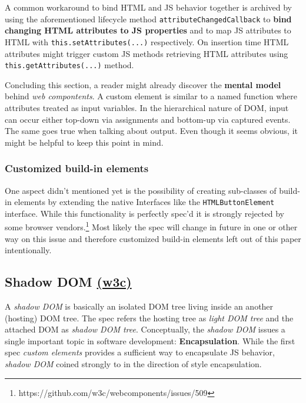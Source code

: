 \documentclass[]{article}
\begin{document}
A common workaround to bind HTML and JS behavior together is archived by
using the aforementioned lifecycle method
\texttt{attributeChangedCallback} to \textbf{bind changing HTML
attributes to JS properties} and to map JS attributes to HTML with
\texttt{this.setAttributes(...)} respectively. On insertion time HTML
attributes might trigger custom JS methods retrieving HTML attributes
using \texttt{this.getAttributes(...)} method.

Concluding this section, a reader might already discover the
\textbf{mental model} behind \emph{web compontents}. A custom element is
similar to a named function where attributes treated as input variables.
In the hierarchical nature of DOM, input can occur either top-down via
assignments and bottom-up via captured events. The same goes true when
talking about output. Even though it seems obvious, it might be helpful
to keep this point in mind.

\subsubsection{Customized build-in
elements}\label{customized-build-in-elements}

One aspect didn't mentioned yet is the possibility of creating
sub-classes of build-in elements by extending the native Interfaces like
the \texttt{HTMLButtonElement} interface. While this functionality is
perfectly spec'd it is strongly rejected by some browser
vendors.\footnote{https://github.com/w3c/webcomponents/issues/509} Most
likely the spec will change in future in one or other way on this issue
and therefore customized build-in elements left out of this paper
intentionally.

\subsection{\texorpdfstring{Shadow DOM
\href{http://w3c.github.io/webcomponents/spec/shadow/}{(w3c)}}{Shadow DOM (w3c)}}\label{shadow-dom-w3c}

A \emph{shadow DOM} is basically an isolated DOM tree living inside an
another (hosting) DOM tree. The spec refers the hosting tree as
\emph{light DOM tree} and the attached DOM as \emph{shadow DOM tree}.
Conceptually, the \emph{shadow DOM} issues a single important topic in
software development: \textbf{Encapsulation}. While the first spec
\emph{custom elements} provides a sufficient way to encapsulate JS
behavior, \emph{shadow DOM} coined strongly to in the direction of style
encapsulation.
\end{document}
